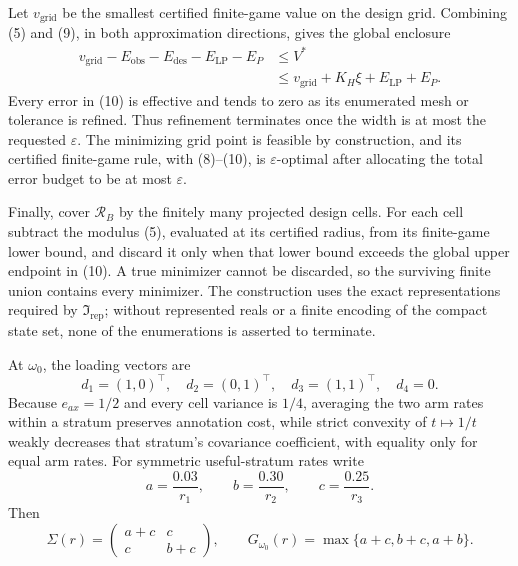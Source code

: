 Let \(v_{\mathrm{grid}}\) be the smallest certified finite-game value on the design grid.  Combining (5) and (9), in both approximation directions, gives the global enclosure
\[
 \begin{split}
 v_{\mathrm{grid}}-E_{\mathrm{obs}}-E_{\mathrm{des}}-E_{\mathrm{LP}}-E_P
 &\leq V^*\\
 &\leq v_{\mathrm{grid}}+K_H\xi+E_{\mathrm{LP}}+E_P.                \tag{10}
 \end{split}
\]
Every error in (10) is effective and tends to zero as its enumerated mesh or tolerance is refined.  Thus refinement terminates once the width is at most the requested \(\varepsilon\).  The minimizing grid point is feasible by construction, and its certified finite-game rule, with (8)--(10), is \(\varepsilon\)-optimal after allocating the total error budget to be at most \(\varepsilon\).

Finally, cover \(\mathcal R_B\) by the finitely many projected design cells.  For each cell subtract the modulus (5), evaluated at its certified radius, from its finite-game lower bound, and discard it only when that lower bound exceeds the global upper endpoint in (10).  A true minimizer cannot be discarded, so the surviving finite union contains every minimizer.  The construction uses the exact representations required by \(\mathfrak I_{\mathrm{rep}}\); without represented reals or a finite encoding of the compact state set, none of the enumerations is asserted to terminate.

At \(\omega_0\), the loading vectors are
\[
 d_1=(1,0)^\top,\quad d_2=(0,1)^\top,\quad d_3=(1,1)^\top,\quad d_4=0.
\]
Because \(e_{ax}=1/2\) and every cell variance is \(1/4\), averaging the two arm rates within a stratum preserves annotation cost, while strict convexity of \(t\mapsto1/t\) weakly decreases that stratum's covariance coefficient, with equality only for equal arm rates.  For symmetric useful-stratum rates write
\[
 a=\frac{0.03}{r_1},\qquad b=\frac{0.30}{r_2},\qquad c=\frac{0.25}{r_3}.
\]
Then
\[
 \Sigma(r)=\begin{pmatrix}a+c&c\\c&b+c\end{pmatrix},\qquad
 G_{\omega_0}(r)=\max\{a+c,b+c,a+b\}.                               \tag{1}
\]

